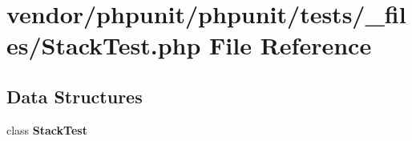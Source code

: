 \section{vendor/phpunit/phpunit/tests/\+\_\+files/\+Stack\+Test.php File Reference}
\label{_stack_test_8php}
\subsection*{Data Structures}
\begin{DoxyCompactItemize}
\item 
class {\bf Stack\+Test}
\end{DoxyCompactItemize}
